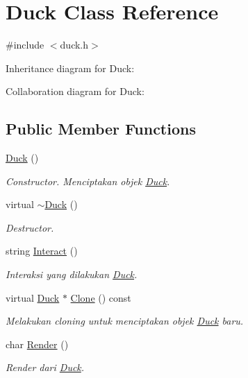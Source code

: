 \hypertarget{classDuck}{}\section{Duck Class Reference}
\label{classDuck}


{\ttfamily \#include $<$duck.\+h$>$}



Inheritance diagram for Duck\+:


Collaboration diagram for Duck\+:
\subsection*{Public Member Functions}
\begin{DoxyCompactItemize}
\item 
\hyperlink{classDuck_a65753b7b6eb80c4639f6bf165b8db9a6}{Duck} ()
\begin{DoxyCompactList}\small\item\em Constructor. Menciptakan objek \hyperlink{classDuck}{Duck}. \end{DoxyCompactList}\item 
virtual \hyperlink{classDuck_a073eb979ff45a938fde4cf769f5e579b}{$\sim$\+Duck} ()
\begin{DoxyCompactList}\small\item\em Destructor. \end{DoxyCompactList}\item 
string \hyperlink{classDuck_a9355aa821755703c02ac96e49692eaea}{Interact} ()
\begin{DoxyCompactList}\small\item\em Interaksi yang dilakukan \hyperlink{classDuck}{Duck}. \end{DoxyCompactList}\item 
virtual \hyperlink{classDuck}{Duck} $\ast$ \hyperlink{classDuck_ae3ff98b443c887f37ce63e3ed2e3a690}{Clone} () const 
\begin{DoxyCompactList}\small\item\em Melakukan cloning untuk menciptakan objek \hyperlink{classDuck}{Duck} baru. \end{DoxyCompactList}\item 
char \hyperlink{classDuck_a8453f95adcf2e7ff1b35a1a9d9948510}{Render} ()
\begin{DoxyCompactList}\small\item\em Render dari \hyperlink{classDuck}{Duck}. \end{DoxyCompactList}\end{DoxyCompactItemize}
